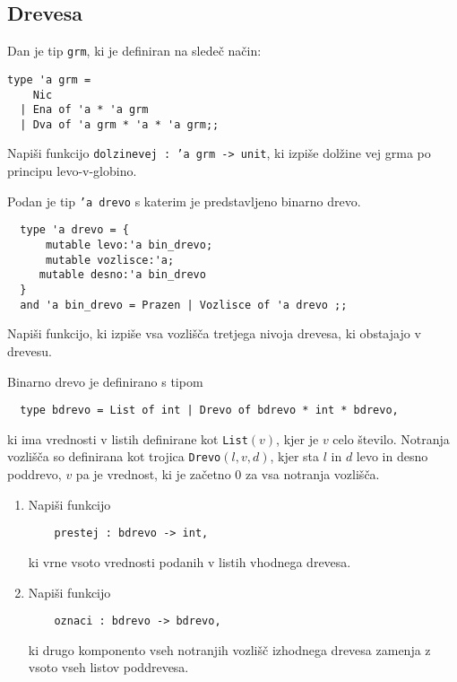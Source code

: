 \subsection{Drevesa}

\begin{ex}
  Dan je tip \texttt{grm}, ki je definiran na slede\v c na\v cin:

\begin{verbatim}
type 'a grm = 
    Nic 
  | Ena of 'a * 'a grm 
  | Dva of 'a grm * 'a * 'a grm;;
\end{verbatim}

  Napi\v si funkcijo \texttt{dolzinevej : 'a grm -> unit}, ki izpi\v
  se dol\v zine vej grma po principu levo-v-globino.


\end{ex} 
\begin{ex} 
  Podan je tip \texttt{'a drevo} s katerim je predstavljeno binarno
  drevo.

  \begin{verbatim}
  type 'a drevo = { 
      mutable levo:'a bin_drevo; 
      mutable vozlisce:'a; 
     mutable desno:'a bin_drevo 
  } 
  and 'a bin_drevo = Prazen | Vozlisce of 'a drevo ;;
  \end{verbatim}

  Napi\v si funkcijo, ki izpi\v se vsa vozli\v s\v ca tretjega nivoja
  drevesa, ki obstajajo v drevesu.


\end{ex} 
\begin{ex}
  Binarno drevo je definirano s tipom
  \begin{verbatim}
  type bdrevo = List of int | Drevo of bdrevo * int * bdrevo,
  \end{verbatim}
  ki ima vrednosti v listih definirane kot \texttt{List}$(v)$, kjer je
  $v$ celo \v stevilo.  Notranja vozli\v s\v ca so definirana kot
  trojica \texttt{Drevo}$(l, v, d)$, kjer sta $l$ in $d$ levo in desno
  poddrevo, $v$ pa je vrednost, ki je za\v cetno $0$ za vsa notranja
  vozli\v s\v ca.

  \begin{enumerate}[label=(\roman*)]
  \item Napi\v si funkcijo
    \begin{verbatim}
    prestej : bdrevo -> int, 
    \end{verbatim}
    ki vrne vsoto vrednosti podanih v listih vhodnega drevesa.

  \item Napi\v si funkcijo
    \begin{verbatim}
    oznaci : bdrevo -> bdrevo,
    \end{verbatim}
    ki drugo komponento vseh notranjih vozli\v s\v c izhodnega drevesa
    zamenja z vsoto vseh listov poddrevesa.
  \end{enumerate}


\end{ex} 

